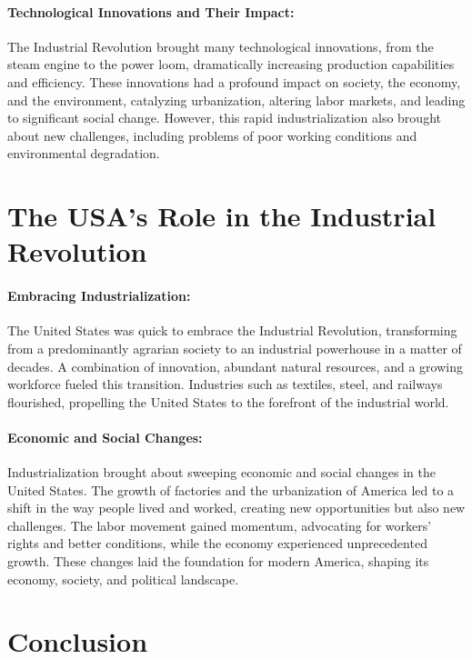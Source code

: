 \documentclass[a4paper,12pt]{book}
\begin{document}
\paragraph{Technological Innovations and Their Impact:}
The Industrial Revolution brought many technological innovations, from the steam engine to the power loom, dramatically increasing production capabilities and efficiency. These innovations had a profound impact on society, the economy, and the environment, catalyzing urbanization, altering labor markets, and leading to significant social change. However, this rapid industrialization also brought about new challenges, including problems of poor working conditions and environmental degradation.

\section*{The USA’s Role in the Industrial Revolution}

\paragraph{Embracing Industrialization:}
The United States was quick to embrace the Industrial Revolution, transforming from a predominantly agrarian society to an industrial powerhouse in a matter of decades. A combination of innovation, abundant natural resources, and a growing workforce fueled this transition. Industries such as textiles, steel, and railways flourished, propelling the United States to the forefront of the industrial world.

\paragraph{Economic and Social Changes:}
Industrialization brought about sweeping economic and social changes in the United States. The growth of factories and the urbanization of America led to a shift in the way people lived and worked, creating new opportunities but also new challenges. The labor movement gained momentum, advocating for workers’ rights and better conditions, while the economy experienced unprecedented growth. These changes laid the foundation for modern America, shaping its economy, society, and political landscape.

\section*{Conclusion}
\end{document}
